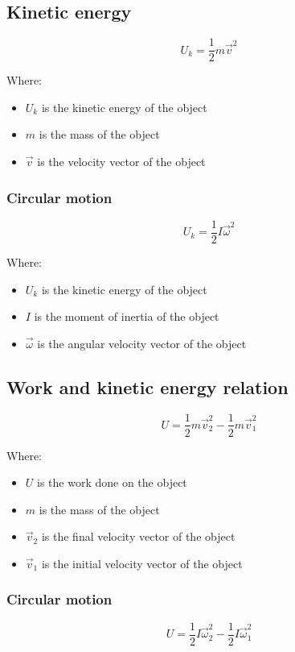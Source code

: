 \documentclass[11pt]{article}
\begin{document}
\subsection{Kinetic energy}
\label{sec:org7206124}
\[U_k = \frac{1}{2} m \vec{v}^2\]

Where:
\begin{itemize}
\item \(U_k\) is the kinetic energy of the object
\item \(m\) is the mass of the object
\item \(\vec{v}\) is the velocity vector of the object
\end{itemize}

\subsubsection{Circular motion}
\label{sec:org2116acf}
\[U_k = \frac{1}{2} I \vec{\omega}^2\]

Where:
\begin{itemize}
\item \(U_k\) is the kinetic energy of the object
\item \(I\) is the moment of inertia of the object
\item \(\vec{\omega}\) is the angular velocity vector of the object
\end{itemize}

\subsection{Work and kinetic energy relation}
\label{sec:org34a5a5d}
\[U = \frac{1}{2} m \vec{v}_2^2 - \frac{1}{2} m \vec{v}_1^2\]

Where:
\begin{itemize}
\item \(U\) is the work done on the object
\item \(m\) is the mass of the object
\item \(\vec{v}_2\) is the final velocity vector of the object
\item \(\vec{v}_1\) is the initial velocity vector of the object
\end{itemize}

\subsubsection{Circular motion}
\label{sec:org800dc10}
\[U = \frac{1}{2} I \vec{\omega}_2^2 - \frac{1}{2} I \vec{\omega}_1^2\]
\end{document}
